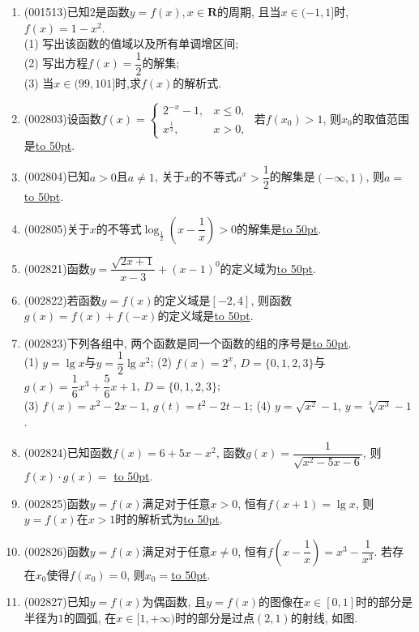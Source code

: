 \documentclass[10pt,a4paper]{article}
\newcommand{\blank}[1]{\underline{\hbox to #1pt{}}}
\begin{document}
\begin{enumerate}[1.]
\item {\tiny (001513)}已知$2$是函数$y=f(x),x\in\mathbf{R}$的周期, 且当$x\in(-1,1]$时, $f(x)=1-x^2$.\\ 
(1) 写出该函数的值域以及所有单调增区间;\\ 
(2) 写出方程$f(x)=\dfrac{1}{2}$的解集;\\ 
(3) 当$x\in(99,101]$时,求$f(x)$的解析式.
\item {\tiny (002803)}设函数$f(x)=\begin{cases} 2^{-x}-1, & x\le 0, \\ x^{\frac 12}, & x>0, \end{cases}$ 若$f(x_0)>1$, 则$x_0$的取值范围是\blank{50}.
\item {\tiny (002804)}已知$a>0$且$a\ne 1$, 关于$x$的不等式$a^x>\dfrac 12$的解集是$(-\infty ,1)$, 则$a=$\blank{50}.
\item {\tiny (002805)}关于$x$的不等式$\log_{\frac 12}(x-\dfrac 1x)>0$的解集是\blank{50}.
\item {\tiny (002821)}函数$y=\dfrac{\sqrt{2x+1}}{x-3}+(x-1)^0$的定义域为\blank{50}.
\item {\tiny (002822)}若函数$y=f(x)$的定义域是$[-2,4]$, 则函数$g(x)=f(x)+f(-x)$的定义域是\blank{50}.
\item {\tiny (002823)}下列各组中, 两个函数是同一个函数的组的序号是\blank{50}.\\
(1) $y=\lg x$与$y=\dfrac 12\lg {x^2}$; (2) $f(x)=2^x$, $D=\{0,1,2,3\}$与$g(x)=\dfrac 16{x^3}+\dfrac 56x+1$, $D=\{0,1,2,3\}$; \\
(3) $f(x)=x^2-2x-1$, $g(t)=t^2-2t-1$; (4) $y=\sqrt{x^2}-1$, $y=\sqrt[3]{x^3}-1$.
\item {\tiny (002824)}已知函数$f(x)=6+5x-x^2$, 函数$g(x)=\dfrac {1}{\sqrt{x^2-5x-6}}$, 则$f(x)\cdot g(x)=$	\blank{50}.
\item {\tiny (002825)}函数$y=f(x)$满足对于任意$x>0$, 恒有$f(x+1)=\lg x$, 则$y=f(x)$在$x>1$时的解析式为\blank{50}.
\item {\tiny (002826)}函数$y=f(x)$满足对于任意$x\ne 0$, 恒有$f(x-\dfrac 1x)=x^3-\dfrac 1{x^3}$. 若存在$x_0$使得$f(x_0)=0$, 则$x_0=$\blank{50}.
\item {\tiny (002827)}已知$y=f(x)$为偶函数, 且$y=f(x)$的图像在$x\in [0,1]$时的部分是半径为$1$的圆弧, 在$x\in [1,+\infty)$时的部分是过点$(2,1)$的射线, 如图.\\
\begin{center}
\end{center}
\end{enumerate}
\end{document}
